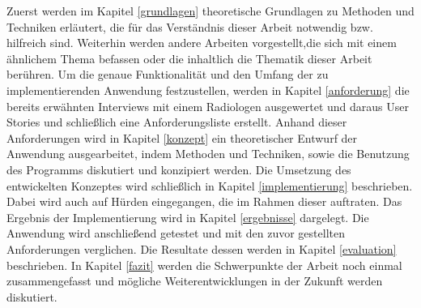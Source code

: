 Zuerst werden im  Kapitel \ref{grundlagen} theoretische Grundlagen zu Methoden und Techniken erläutert, die für das Verständnis dieser Arbeit notwendig bzw. hilfreich sind. Weiterhin werden andere Arbeiten vorgestellt,die sich mit einem ähnlichem Thema befassen oder die inhaltlich die Thematik dieser Arbeit berühren.
Um die genaue Funktionalität und den Umfang der zu implementierenden Anwendung festzustellen, werden in Kapitel \ref{anforderung} die bereits erwähnten Interviews mit einem Radiologen ausgewertet und daraus User Stories und schließlich eine Anforderungsliste erstellt.
Anhand dieser Anforderungen wird in Kapitel \ref{konzept} ein theoretischer Entwurf der Anwendung ausgearbeitet, indem Methoden und Techniken, sowie die Benutzung des Programms diskutiert und konzipiert werden.
Die Umsetzung des entwickelten Konzeptes wird schließlich in Kapitel \ref{implementierung} beschrieben. Dabei wird auch auf Hürden eingegangen, die im Rahmen dieser auftraten.
Das Ergebnis der Implementierung wird in Kapitel \ref{ergebnisse} dargelegt.
Die Anwendung wird anschließend getestet und mit den zuvor gestellten Anforderungen verglichen. Die Resultate dessen werden in Kapitel \ref{evaluation} beschrieben. 
In Kapitel \ref{fazit} werden die Schwerpunkte der Arbeit noch einmal zusammengefasst und mögliche Weiterentwicklungen in der Zukunft werden diskutiert. 
 
